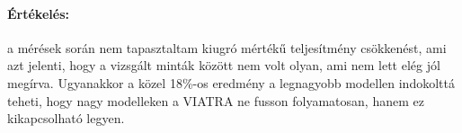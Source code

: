 \paragraph{Értékelés:} a mérések során nem tapasztaltam kiugró mértékű teljesítmény csökkenést, ami azt jelenti, hogy a vizsgált minták között nem volt olyan, ami nem lett elég jól megírva. Ugyanakkor a közel 18\%-os eredmény a legnagyobb modellen indokolttá teheti, hogy nagy modelleken a VIATRA ne fusson folyamatosan, hanem ez kikapcsolható legyen.





